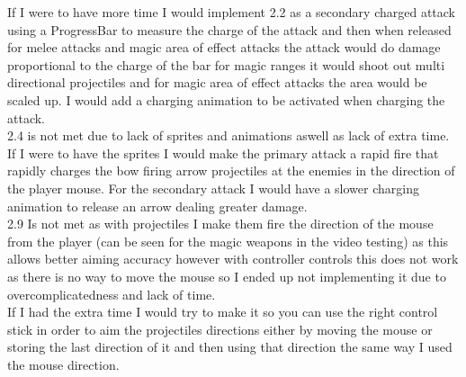 \documentclass{article}
\begin{document}
        If I were to have more time I would implement 2.2 as a secondary charged attack using a ProgressBar to measure the charge of the attack and then when released for melee attacks and magic area of effect attacks the attack would do damage proportional to the charge of the bar for magic ranges it would shoot out multi directional projectiles and for magic area of effect attacks the area would be scaled up. I would add a charging animation to be activated when charging the attack.\\
        2.4 is not met due to lack of sprites and animations aswell as lack of extra time.\\
        If I were to have the sprites I would make the primary attack a rapid fire that rapidly charges the bow firing arrow projectiles at the enemies in the direction of the player mouse. For the secondary attack I would have a slower charging animation to release an arrow dealing greater damage.\\
        2.9 Is not met as with projectiles I make them fire the direction of the mouse from the player (can be seen for the magic weapons in  the video testing) as this allows better aiming accuracy however with controller controls this does not work as there is no way to move the mouse so I ended up not implementing it due to overcomplicatedness and lack of time.\\
        If I had the extra time I would try to make it so you can use the right control stick in order to aim the projectiles directions either by moving the mouse or storing the last direction of it and then using that direction the same way I used the mouse direction.\\
\end{document}
